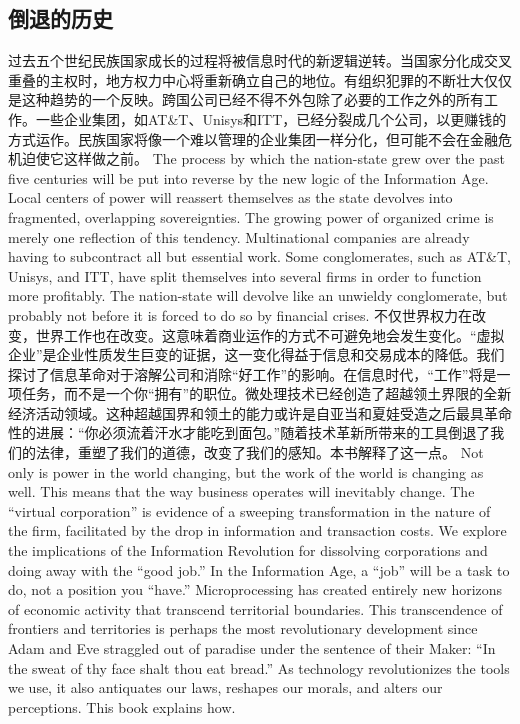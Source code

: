 \subsection{倒退的历史}
\begin{paracol}{2}[]
过去五个世纪民族国家成长的过程将被信息时代的新逻辑逆转。当国家分化成交叉重叠的主权时，地方权力中心将重新确立自己的地位。有组织犯罪的不断壮大仅仅是这种趋势的一个反映。跨国公司已经不得不外包除了必要的工作之外的所有工作。一些企业集团，如AT\&T、Unisys和ITT，已经分裂成几个公司，以更赚钱的方式运作。民族国家将像一个难以管理的企业集团一样分化，但可能不会在金融危机迫使它这样做之前。
\switchcolumn
The process by which the nation-state grew over the past five centuries will be put into reverse by the new logic of the Information Age. Local centers of power will reassert themselves as the state devolves into fragmented, overlapping sovereignties. The growing power of organized crime is merely one reflection of this tendency. Multinational companies are already having to subcontract all but essential work. Some conglomerates, such as AT\&T, Unisys, and ITT, have split themselves into several firms in order to function more profitably. The nation-state will devolve like an unwieldy conglomerate, but probably not before it is forced to do so by financial crises.
\switchcolumn*
不仅世界权力在改变，世界工作也在改变。这意味着商业运作的方式不可避免地会发生变化。“虚拟企业”是企业性质发生巨变的证据，这一变化得益于信息和交易成本的降低。我们探讨了信息革命对于溶解公司和消除“好工作”的影响。在信息时代，“工作”将是一项任务，而不是一个你“拥有”的职位。微处理技术已经创造了超越领土界限的全新经济活动领域。这种超越国界和领土的能力或许是自亚当和夏娃受造之后最具革命性的进展：“你必须流着汗水才能吃到面包。”随着技术革新所带来的工具倒退了我们的法律，重塑了我们的道德，改变了我们的感知。本书解释了这一点。
\switchcolumn
Not only is power in the world changing, but the work of the world is changing as well. This means that the way business operates will inevitably change. The “virtual corporation” is evidence of a sweeping transformation in the nature of the firm, facilitated by the drop in information and transaction costs. We explore the implications of the Information Revolution for dissolving corporations and doing away with the “good job.” In the Information Age, a “job” will be a task to do, not a position you “have.” Microprocessing has created entirely new horizons of economic activity that transcend territorial boundaries. This transcendence of frontiers and territories is perhaps the most revolutionary development since Adam and Eve straggled out of paradise under the sentence of their Maker: “In the sweat of thy face shalt thou eat bread.” As technology revolutionizes the tools we use, it also antiquates our laws, reshapes our morals, and alters our perceptions. This book explains how.

\end{paracol}
